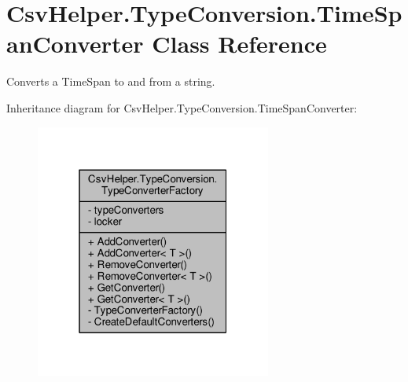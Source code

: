 \hypertarget{a00174}{\section{Csv\-Helper.\-Type\-Conversion.\-Time\-Span\-Converter Class Reference}
\label{a00174}
}


Converts a Time\-Span to and from a string.  




Inheritance diagram for Csv\-Helper.\-Type\-Conversion.\-Time\-Span\-Converter\-:
\nopagebreak
\begin{figure}[H]
\begin{center}
\leavevmode
\includegraphics[width=220pt]{a00572}
\end{center}
\end{figure}


